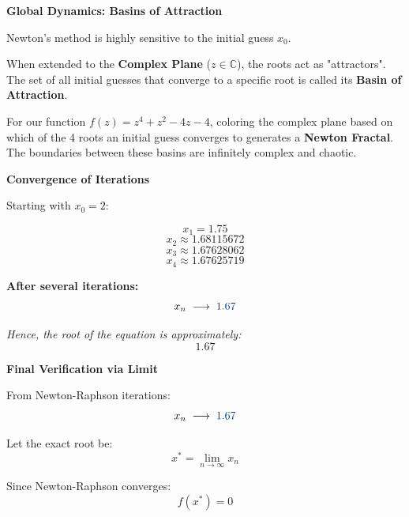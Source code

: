 \documentclass[12pt]{beamer}
\begin{document}
\begin{frame}{\textbf{Global Dynamics: Basins of Attraction}}
  \begin{center}
  \vfill
  Newton's method is highly sensitive to the initial guess $x_0$. 
  \vspace{1em}
  
  When extended to the \textbf{Complex Plane} ($z \in \mathbb{C}$), the roots act as "attractors". The set of all initial guesses that converge to a specific root is called its \textbf{Basin of Attraction}.
  \vspace{1em}
  
  For our function $f(z) = z^4 + z^2 - 4z - 4$, coloring the complex plane based on which of the 4 roots an initial guess converges to generates a \textbf{Newton Fractal}. The boundaries between these basins are infinitely complex and chaotic.
  \vfill
  \end{center}
\end{frame}


\begin{frame}{\textbf{Convergence of Iterations}}

\begin{center}
\vfill

Starting with $x_0 = 2$:

\[
x_1 = 1.75
\]
\[
x_2 \approx 1.68115672
\]
\[
x_3 \approx 1.67628062
\]
\[
x_4 \approx 1.67625719
\]

\vspace{1em}

\textbf{After several iterations:}
\[
x_n \;\longrightarrow\; \textcolor{madblue}{1.67}
\]

\vspace{1em}

\textit{Hence, the root of the equation is approximately:}
\[
\boxed{1.67}
\]

\vfill
\end{center}
\end{frame}

\begin{frame}{\textbf{Final Verification via Limit}}

\begin{center}
\vfill

From Newton-Raphson iterations:
\[
x_n \;\longrightarrow\; \textcolor{madblue}{1.67}
\]

\vspace{1em}

Let the exact root be:
\[
x^* = \lim_{n \to \infty} x_n
\]

\vspace{1em}

Since Newton-Raphson converges:
\[
f(x^*) = 0
\]

\vspace{1em}
\end{center}
\end{frame}
\end{document}

